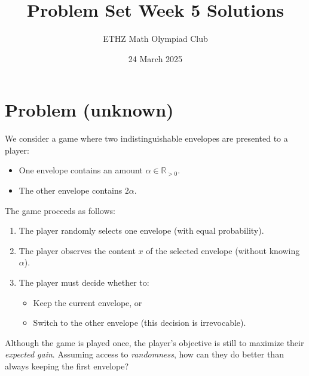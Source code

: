 \documentclass[11pt, a4paper, oneside]{article}
\title{Problem Set Week 5 Solutions}
\author{ETHZ Math Olympiad Club}
\date{24 March 2025}
\newcommand{\problem}[1][]{\section{#1} \hfill \par}
\theoremstyle{remark}
\theoremstyle{lemma}
\begin{document}
\maketitle

\problem[Problem (unknown)]
We consider a game where two indistinguishable envelopes are presented to a player:
\begin{itemize}
    \item One envelope contains an amount $\alpha \in \mathbb{R}_{>0}$.
    \item The other envelope contains $2\alpha$.
\end{itemize}

The game proceeds as follows:
\begin{enumerate}
    \item The player randomly selects one envelope (with equal probability).
    \item The player observes the content $x$ of the selected envelope (without knowing $\alpha$).
    \item The player must decide whether to:
    \begin{itemize}
        \item Keep the current envelope, or
        \item Switch to the other envelope (this decision is irrevocable).
    \end{itemize}
\end{enumerate}
Although the game is played once, the player's objective is still to maximize their \textit{expected gain}. Assuming access to \textit{randomness}, how can they do better than always keeping the first envelope?
\end{document}

